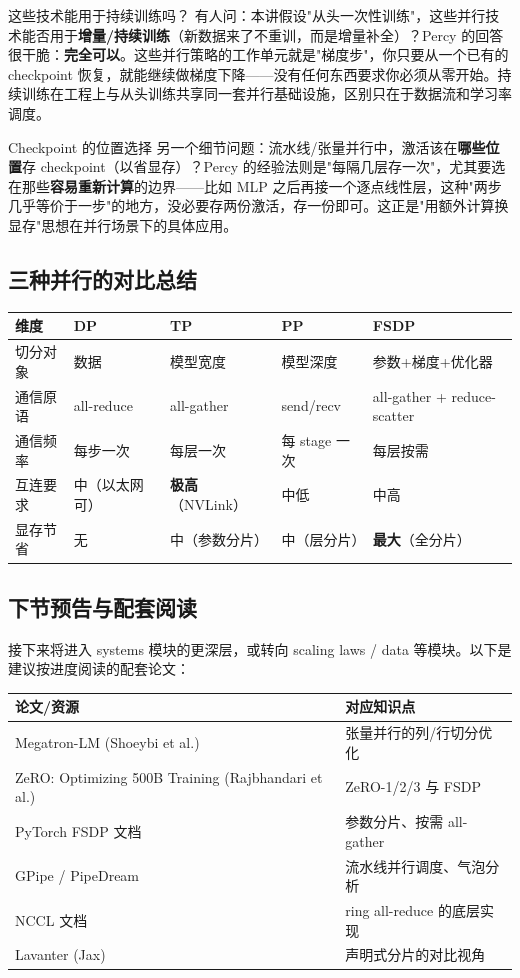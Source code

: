 \documentclass[a4paper]{article}
\begin{document}
\begin{importantbox}{这些技术能用于持续训练吗？}
有人问：本讲假设"从头一次性训练"，这些并行技术能否用于\textbf{增量/持续训练}（新数据来了不重训，而是增量补全）？Percy 的回答很干脆：\textbf{完全可以}。这些并行策略的工作单元就是"梯度步"，你只要从一个已有的 checkpoint 恢复，就能继续做梯度下降——没有任何东西要求你必须从零开始。持续训练在工程上与从头训练共享同一套并行基础设施，区别只在于数据流和学习率调度。
\end{importantbox}

\begin{warningbox}{Checkpoint 的位置选择}
另一个细节问题：流水线/张量并行中，激活该在\textbf{哪些位置}存 checkpoint（以省显存）？Percy 的经验法则是"每隔几层存一次"，尤其要选在那些\textbf{容易重新计算}的边界——比如 MLP 之后再接一个逐点线性层，这种"两步几乎等价于一步"的地方，没必要存两份激活，存一份即可。这正是"用额外计算换显存"思想在并行场景下的具体应用。
\end{warningbox}

\subsection{三种并行的对比总结}

\begin{tabular}{p{2cm}p{2.5cm}p{2.5cm}p{2.5cm}p{2.5cm}}
\toprule
\textbf{维度} & \textbf{DP} & \textbf{TP} & \textbf{PP} & \textbf{FSDP} \\
\midrule
切分对象 & 数据 & 模型宽度 & 模型深度 & 参数+梯度+优化器 \\
通信原语 & all-reduce & all-gather & send/recv & all-gather + reduce-scatter \\
通信频率 & 每步一次 & 每层一次 & 每 stage 一次 & 每层按需 \\
互连要求 & 中（以太网可） & \textbf{极高}（NVLink） & 中低 & 中高 \\
显存节省 & 无 & 中（参数分片） & 中（层分片） & \textbf{最大}（全分片） \\
\bottomrule
\end{tabular}

\subsection{下节预告与配套阅读}

接下来将进入 systems 模块的更深层，或转向 scaling laws / data 等模块。以下是建议按进度阅读的配套论文：

\begin{tabular}{p{7cm}p{6cm}}
\toprule
\textbf{论文/资源} & \textbf{对应知识点} \\
\midrule
Megatron-LM (Shoeybi et al.) & 张量并行的列/行切分优化 \\
ZeRO: Optimizing 500B Training (Rajbhandari et al.) & ZeRO-1/2/3 与 FSDP \\
PyTorch FSDP 文档 & 参数分片、按需 all-gather \\
GPipe / PipeDream & 流水线并行调度、气泡分析 \\
NCCL 文档 & ring all-reduce 的底层实现 \\
Lavanter (Jax) & 声明式分片的对比视角 \\
\bottomrule
\end{tabular}

\end{document}
